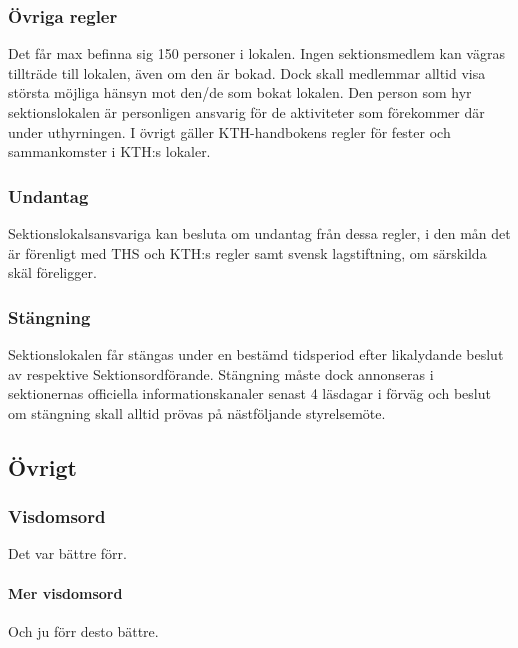 \documentclass[a4paper,12pt]{article}
\begin{document}
\subsubsection{Övriga regler}

Det får max befinna sig 150 personer i lokalen. Ingen sektionsmedlem kan
vägras tillträde till lokalen, även om den är bokad. Dock skall medlemmar alltid visa största möjliga hänsyn mot den/de som bokat lokalen. Den person som hyr sektionslokalen är personligen ansvarig för de aktiviteter som förekommer där under uthyrningen. I övrigt gäller KTH-handbokens regler för
fester och sammankomster i KTH:s lokaler.

\subsubsection{Undantag}

Sektionslokalsansvariga kan besluta om undantag från dessa regler, i den mån det är förenligt med THS och KTH:s regler samt svensk lagstiftning, om särskilda skäl föreligger.

\subsubsection{Stängning}

Sektionslokalen får stängas under en bestämd tidsperiod efter likalydande beslut av respektive Sektionsordförande. Stängning måste dock annonseras i sektionernas officiella informationskanaler senast 4 läsdagar i förväg och beslut om stängning skall alltid prövas på nästföljande styrelsemöte.

\subsection{Övrigt}

\subsubsection{Visdomsord}

Det var bättre förr.

\paragraph{Mer visdomsord}

Och ju förr desto bättre.
\end{document}

